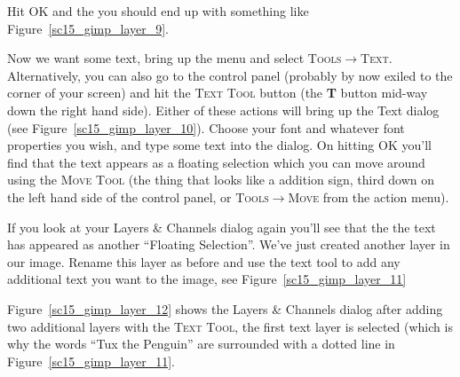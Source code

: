 \documentclass[twoside,11pt]{starlink}
\begin{document}

Hit \textsc{OK} and the you should end up with something like
Figure~\ref{sc15_gimp_layer_9}.


Now we want some text, bring up the menu and select \textsc{Tools}$\rightarrow$\textsc{Text}. Alternatively, you can also go to the
control panel (probably by now exiled to the corner of your screen)
and hit the \textsc{Text Tool} button (the \textbf{T} button mid-way down
the right hand side). Either of these actions will bring up the Text
dialog (see Figure~\ref{sc15_gimp_layer_10}). Choose your font and
whatever font properties you wish, and type some text into the dialog.
On hitting \textsc{OK} you'll find that the text appears as a floating
selection which you can move around using the \textsc{Move Tool} (the
thing that looks like a addition sign, third down on the left hand
side of the control panel, or \textsc{Tools}$\rightarrow$\textsc{Move} from
the action menu).


If you look at your Layers \& Channels dialog again you'll see that
the the text has appeared as another ``Floating Selection''. We've
just created another layer in our image. Rename this layer as before
and use the text tool to add any additional text you want to the
image, see Figure~\ref{sc15_gimp_layer_11}


Figure~\ref{sc15_gimp_layer_12} shows the Layers \& Channels dialog
after adding two additional layers with the \textsc{Text Tool}, the first
text layer is selected (which is why the words ``Tux the Penguin'' are
surrounded with a dotted line in Figure~\ref{sc15_gimp_layer_11}.

\end{document}
